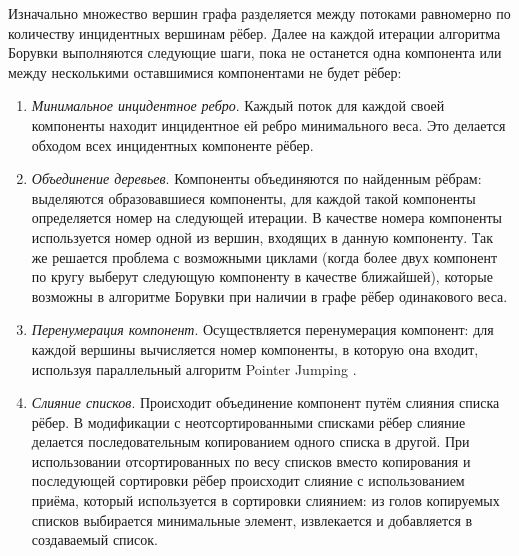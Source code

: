 \documentclass[a4paper,10pt]{extarticle}
\begin{document}
Изначально множество вершин графа разделяется между потоками равномерно по количеству инцидентных вершинам рёбер.
Далее на каждой итерации алгоритма Борувки выполняются следующие шаги, пока не останется одна компонента или между несколькими оставшимися компонентами не будет рёбер:
\begin{enumerate}
    \item \textit{Минимальное инцидентное ребро}.
        Каждый поток для каждой своей компоненты находит инцидентное ей ребро минимального веса. Это делается обходом всех инцидентных компоненте рёбер.
    \item \textit{Объединение деревьев}.
        Компоненты объединяются по найденным рёбрам: выделяются образовавшиеся компоненты, для каждой такой компоненты определяется номер на следующей итерации.
        В качестве номера компоненты используется номер одной из вершин, входящих в данную компоненту.
          Так же решается проблема с возможными циклами (когда более двух компонент по кругу выберут следующую компоненту в качестве ближайшей), которые возможны в алгоритме Борувки при наличии в графе рёбер одинакового веса.
    \item \textit{Перенумерация компонент}.
          Осуществляется перенумерация компонент: для каждой вершины вычисляется номер компоненты, в которую она входит, используя параллельный алгоритм Pointer Jumping \cite{pointer-jumping}. 
    \item \textit{Слияние списков}.
        Происходит объединение компонент путём слияния списка рёбер. В модификации с неотсортированными списками рёбер слияние делается последовательным копированием одного списка в другой. При использовании отсортированных по весу списков вместо копирования и последующей сортировки рёбер происходит слияние с использованием приёма, который используется в сортировки слиянием: из голов копируемых списков выбирается минимальные элемент, извлекается и добавляется в создаваемый список.
\end{enumerate}
\end{document}
